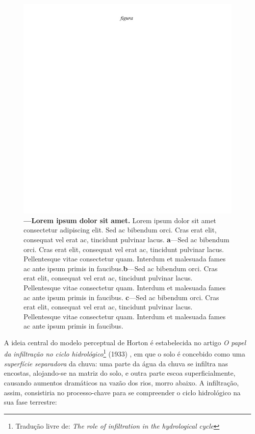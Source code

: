 \documentclass[./main.tex]{subfiles}
\begin{document}
\begin{figure}[t!] 
\centering				
\includegraphics[width=0.95\linewidth]{figs/fig_g.jpg}		
\caption[Lorem ipsum dolor sit amet]
{\textbf{---\;Lorem ipsum dolor sit amet.}
    Lorem ipsum dolor sit amet consectetur adipiscing elit. Sed ac bibendum orci. Cras erat elit, consequat vel erat ac, tincidunt pulvinar lacus. \;\textbf{a}\;---\;Sed ac bibendum orci. Cras erat elit, consequat vel erat ac, tincidunt pulvinar lacus. Pellentesque vitae consectetur quam. Interdum et malesuada fames ac ante ipsum primis in faucibus.\;\textbf{b}\;---\;Sed ac bibendum orci. Cras erat elit, consequat vel erat ac, tincidunt pulvinar lacus. Pellentesque vitae consectetur quam. Interdum et malesuada fames ac ante ipsum primis in faucibus. \;\textbf{c}\;---\;Sed ac bibendum orci. Cras erat elit, consequat vel erat ac, tincidunt pulvinar lacus. Pellentesque vitae consectetur quam. Interdum et malesuada fames ac ante ipsum primis in faucibus.
}
\label{fig:hydro:horton} 		
\end{figure}

\par A ideia central do modelo perceptual de Horton é estabelecida no artigo \textit{O papel da infiltração no ciclo hidrológico}\footnote{Tradução livre de: \textit{The role of infiltration in the hydrological cycle}} (1933) \cite{Horton1933}, em que o solo é concebido como uma \textit{superfície separadora} da chuva: uma parte da água da chuva se infiltra nas encostas, alojando-se na matriz do solo, e outra parte escoa superficialmente, causando aumentos dramáticos na vazão dos rios, morro abaixo. A infiltração, assim, consistiria no processo-chave para se compreender o ciclo hidrológico na sua fase terrestre:
\end{document}
